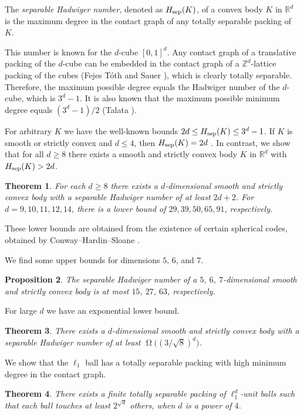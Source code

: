\documentclass[a4paper,12pt]{article}
\theoremstyle{plain}
\newtheorem{theorem}{Theorem}
\newtheorem{proposition}[theorem]{Proposition}
\theoremstyle{definition}
\newcommand{\numbersystem}[1]{\mathbb{#1}}
\newcommand{\bR}{\numbersystem{R}}
\newcommand{\bZ}{\numbersystem{Z}}
\newcommand{\Red}{\bR^d}
\newcommand{\Hsep}{H_{\textnormal{sep}}}
\begin{document}
The \emph{separable Hadwiger number}, denoted as $\Hsep(K)$, of a convex body 
$K$ in $\Red$ is the maximum degree in the contact graph of any totally 
separable packing of $K$.

This number is known for the $d$-cube $[0,1]^d$.
Any contact graph of a translative packing of the $d$-cube 
can be embedded in the contact graph of a $\bZ^d$-lattice packing of the cubes (Fejes 
T\'oth and Sauer \cite{FTS77}), which is clearly totally separable.
Therefore, the maximum possible degree equals the Hadwiger number of the 
$d$-cube, which is $3^d-1$.
It is also known that the maximum possible minimum degree equals 
$(3^d-1)/2$ (Talata \cite{T11}).

For arbitrary $K$ we have the well-known bounds $2d\leq\Hsep(K)\leq 3^d-1$.
If $K$ is smooth or strictly convex and $d\leq 4$, then $\Hsep(K)=2d$ \cite{BN18}.
In contrast, we show that for all $d\geq 8$ there exists a 
smooth and strictly convex body $K$
in $\bR^d$ with $\Hsep(K)>2d$.
\begin{theorem}\label{thm:ddimsmall}
For each $d\geq 8$ there exists a $d$-dimensional smooth and strictly convex body with a separable 
Hadwiger number of at least $2d+2$.
For $d=9, 10,11,12,14$, there is a lower bound of $29, 39, 50, 65, 91$, respectively.
\end{theorem}
These lower bounds are obtained from the existence of certain spherical codes, obtained by Conway--Hardin--Sloane \cite{CHS96}.

We find some upper bounds for dimensions $5$, $6$, and $7$.

\begin{proposition}\label{thm:uppersmall2}
The separable Hadwiger number of a $5$, $6$, $7$-dimensional smooth and strictly convex body is at most $15$, $27$, $63$, respectively.
\end{proposition}
For large $d$ we have an exponential lower bound.
\begin{theorem}\label{thm:ddimbig}
There exists a $d$-dimensional smooth and strictly convex body with a separable 
Hadwiger number of at least $\upOmega\bigl((3/\sqrt{8})^d\bigr)$.
\end{theorem}

We show that the $\ell_1$ ball has a totally separable packing with high 
minimum degree in the contact graph.
\begin{theorem}\label{thm:ell1}
There exists a finite totally separable packing of $\ell_1^d$-unit balls such 
that each ball touches at least $2^{\sqrt{d}}$ others, when $d$ is a power of 
$4$. 
\end{theorem}
\end{document}
